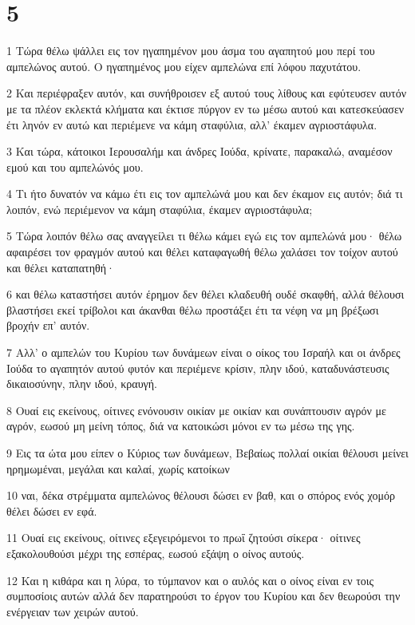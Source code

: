 \chapter{5}

\par 1 Τώρα θέλω ψάλλει εις τον ηγαπημένον μου άσμα του αγαπητού μου περί του αμπελώνος αυτού. Ο ηγαπημένος μου είχεν αμπελώνα επί λόφου παχυτάτου.
\par 2 Και περιέφραξεν αυτόν, και συνήθροισεν εξ αυτού τους λίθους και εφύτευσεν αυτόν με τα πλέον εκλεκτά κλήματα και έκτισε πύργον εν τω μέσω αυτού και κατεσκεύασεν έτι ληνόν εν αυτώ και περιέμενε να κάμη σταφύλια, αλλ' έκαμεν αγριοστάφυλα.
\par 3 Και τώρα, κάτοικοι Ιερουσαλήμ και άνδρες Ιούδα, κρίνατε, παρακαλώ, αναμέσον εμού και του αμπελώνός μου.
\par 4 Τι ήτο δυνατόν να κάμω έτι εις τον αμπελώνά μου και δεν έκαμον εις αυτόν; διά τι λοιπόν, ενώ περιέμενον να κάμη σταφύλια, έκαμεν αγριοστάφυλα;
\par 5 Τώρα λοιπόν θέλω σας αναγγείλει τι θέλω κάμει εγώ εις τον αμπελώνά μου· θέλω αφαιρέσει τον φραγμόν αυτού και θέλει καταφαγωθή θέλω χαλάσει τον τοίχον αυτού και θέλει καταπατηθή·
\par 6 και θέλω καταστήσει αυτόν έρημον δεν θέλει κλαδευθή ουδέ σκαφθή, αλλά θέλουσι βλαστήσει εκεί τρίβολοι και άκανθαι θέλω προστάξει έτι τα νέφη να μη βρέξωσι βροχήν επ' αυτόν.
\par 7 Αλλ' ο αμπελών του Κυρίου των δυνάμεων είναι ο οίκος του Ισραήλ και οι άνδρες Ιούδα το αγαπητόν αυτού φυτόν και περιέμενε κρίσιν, πλην ιδού, καταδυνάστευσις δικαιοσύνην, πλην ιδού, κραυγή.
\par 8 Ουαί εις εκείνους, οίτινες ενόνουσιν οικίαν με οικίαν και συνάπτουσιν αγρόν με αγρόν, εωσού μη μείνη τόπος, διά να κατοικώσι μόνοι εν τω μέσω της γης.
\par 9 Εις τα ώτα μου είπεν ο Κύριος των δυνάμεων, Βεβαίως πολλαί οικίαι θέλουσι μείνει ηρημωμέναι, μεγάλαι και καλαί, χωρίς κατοίκων
\par 10 ναι, δέκα στρέμματα αμπελώνος θέλουσι δώσει εν βαθ, και ο σπόρος ενός χομόρ θέλει δώσει εν εφά.
\par 11 Ουαί εις εκείνους, οίτινες εξεγειρόμενοι το πρωΐ ζητούσι σίκερα· οίτινες εξακολουθούσι μέχρι της εσπέρας, εωσού εξάψη ο οίνος αυτούς.
\par 12 Και η κιθάρα και η λύρα, το τύμπανον και ο αυλός και ο οίνος είναι εν τοις συμποσίοις αυτών αλλά δεν παρατηρούσι το έργον του Κυρίου και δεν θεωρούσι την ενέργειαν των χειρών αυτού.
